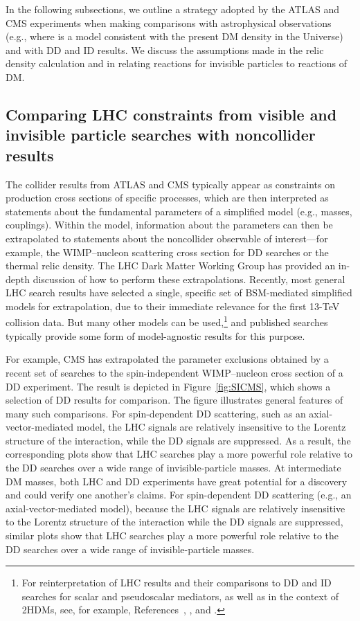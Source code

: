 \documentclass{ar-1col}
\newcommand{\IP}{invisible particle}
\begin{document}
In the following subsections, we outline a strategy adopted by the ATLAS and
CMS experiments when making comparisons with astrophysical
observations (e.g., where is a model consistent with the present
DM density in the Universe) and with DD and ID results. We discuss the
assumptions made in the relic density calculation and in relating
reactions for {\IP}s to reactions of DM.

\subsection{Comparing LHC constraints from visible and invisible particle searches with noncollider results}

The collider results from ATLAS and CMS typically appear as constraints
on production cross sections of specific processes, which are then
interpreted as statements about the fundamental parameters of a
simplified model (e.g., masses, couplings). Within the model,
information about the parameters can then be extrapolated to
statements about the noncollider observable of interest---for
example, the WIMP--nucleon scattering cross section for DD searches or the
thermal relic density. The LHC Dark
Matter Working Group \cite{Boveia:2016mrp} has provided an in-depth discussion of how to
perform these extrapolations. Recently, most general LHC search
results have selected a single, specific set of BSM-mediated
simplified models for extrapolation, due to their immediate
relevance for the first 13-TeV collision data. But many other
models can be used,\footnote{For reinterpretation of LHC results
and their comparisons to DD and ID searches for scalar and pseudoscalar
mediators, as well as in the context of 2HDMs, see, for example, References~, , and .} and
published searches typically provide some form of model-agnostic
results for this purpose.

For example, CMS has extrapolated the parameter exclusions
obtained by a recent set of searches to the spin-independent
WIMP--nucleon cross section of a DD experiment. The
result is depicted in Figure~\ref{fig:SICMS}, which shows a selection of DD results
for comparison. The figure illustrates general features of
many such comparisons. For spin-dependent DD scattering, such as an axial-vector-mediated model, the LHC signals are relatively insensitive to the Lorentz structure of the interaction, while the DD signals are suppressed. As a result, the corresponding plots show that LHC searches play a more powerful role relative to the DD searches over a wide range of invisible-particle masses. At intermediate DM masses,
both LHC and DD experiments have great potential for a discovery
and could verify one another's claims. For spin-dependent DD
scattering (e.g., an axial-vector-mediated model), because the LHC
signals are relatively insensitive to the Lorentz structure of the
interaction while the DD signals are suppressed, similar plots
show that LHC searches play a more powerful role relative to the
DD searches over a wide range of invisible-particle masses.
\end{document}
